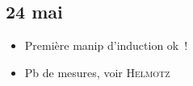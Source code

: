 \documentclass[a4paper, 11pt, final, garamond]{book}
\begin{document}
\subsection{24 mai}
\begin{itemize}
	\item Première manip d'induction ok~!
	\item Pb de mesures, voir \textsc{Helmotz}
\end{itemize}

%
%
%
%
%
\end{document}
